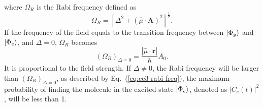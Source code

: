 where $\Omega_{R}$ is the Rabi frequency defined as
\begin{equation}
\Omega_{R} = [\Delta^{2} + (\hat{\mu} \cdot \textbf{A})^{2}]^{\frac{1}{2}}.
\label{eq:cc3-rabi-freq}
\end{equation}
If the frequency of the field equals to the transition frequency between $| \Phi_{g} \rangle$ and $| \Phi_{e} \rangle$, and $\Delta=0$, $\Omega_{R}$ becomes
\begin{equation}
(\Omega_{R})_{\Delta=0} = \frac{|\hat{\mu} \cdot \textbf{r}|}{\hbar} A_{0}.
\end{equation}
It is proportional to the field strength. If $\Delta \neq 0$, the Rabi frequency will be larger than $(\Omega_{R})_{\Delta=0}$, as described by Eq.~(\ref{eq:cc3-rabi-freq}), the maximum probability of finding the molecule in the excited state $| \Phi_{e} \rangle$, denoted as $|C_{e}(t)|^{2}$, will be less than 1. 

